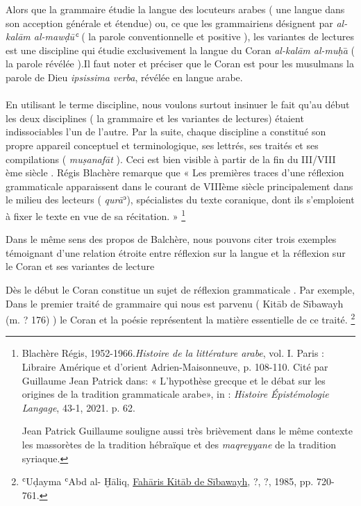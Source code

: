 \documentclass[a4paper,12pt]{report}
\begin{document}
\begin{itemize}
Alors que la grammaire  étudie la langue des locuteurs arabes  ( une langue dans son acception générale et étendue)  ou, ce que les grammairiens désignent par   \textit{al-kalām  al-mawḍūʿ } ( la  parole conventionnelle et positive ), les variantes de lectures est une discipline qui  étudie  exclusivement la langue  du Coran  \textit{al-kalām al-muḥa}̄ (  la parole   révélée  ).Il faut noter et préciser que le Coran est  pour les musulmans  la parole de Dieu \textit{ipsissima verba}, révélée en langue arabe. 

\paragraph{}
En  utilisant le terme  discipline, nous voulons surtout insinuer le fait qu’au début les deux disciplines ( la grammaire et les variantes de lectures) étaient indissociables l'un de l'autre. Par la suite, chaque  discipline  a constitué son propre appareil conceptuel et terminologique,  ses lettrés, ses traités et ses compilations ( \textit{muṣanafāt} ). Ceci est bien visible à partir de la fin du III/VIII ème siècle . Régis Blachère remarque que  « Les premières traces d'une réflexion grammaticale apparaissent dans le courant de VIIIème siècle principalement dans le milieu  des lecteurs  ( \textit{qurā}ʾ), spécialistes du texte coranique, dont ils s'emploient à fixer le texte  en vue de sa récitation. » \footnote{ Blachère Régis, 1952-1966.\textit{Histoire de la littérature arabe}, vol. I. Paris : Libraire Amérique et d'orient Adrien-Maisonneuve, p. 108-110. Cité par Guillaume Jean Patrick  dans:  « L'hypothèse grecque et le débat sur les origines de la tradition grammaticale arabe», in : \textit{Histoire Épistémologie Langage}, 43-1, 2021. p. 62.  

Jean Patrick Guillaume souligne aussi très brièvement dans le même contexte les massorètes de la tradition hébraïque et des \textit{maqreyyane} de la tradition syriaque.}  

Dans le même sens des propos de Balchère, nous pouvons citer trois exemples  témoignant d'une relation étroite entre réflexion sur la langue et la réflexion sur le Coran et ses variantes de lecture


\hspace*{1cm}  Dès le début le Coran constitue un sujet de réflexion grammaticale . Par exemple,  Dans le premier traité de grammaire qui nous est parvenu ( Kitāb de Sībawayh (m. ? 176) ) le Coran et la poésie représentent la matière essentielle de ce traité.   \footnote {ʿUḍayma ʿAbd al- Ḫāliq, \underline {Fahāris  Kitāb de Sībawayh}, ?, ?, 1985, pp. 720-761.

}
\end{itemize}
\end{document}
